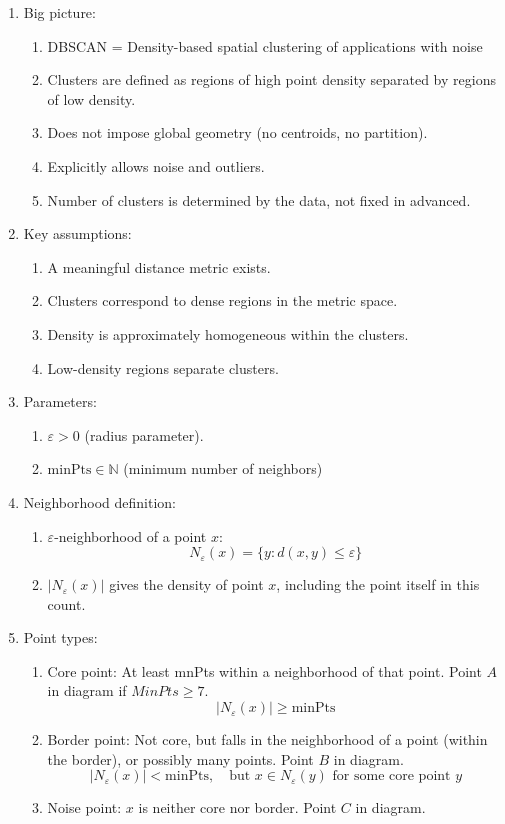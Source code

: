 \documentclass{article}
\begin{document}
\begin{enumerate}
\item Big picture:
\begin{enumerate}
\item DBSCAN = Density-based spatial clustering of applications with noise
\item Clusters are defined as regions of high point density separated by regions of low density.
\item Does not impose global geometry (no centroids, no partition).
\item Explicitly allows noise and outliers.
\item Number of clusters is determined by the data, not fixed in advanced.
\end{enumerate}

\item Key assumptions:
\begin{enumerate}
\item A meaningful distance metric exists.
\item Clusters correspond to dense regions in the metric space.
\item Density is approximately homogeneous within the clusters.
\item Low-density regions separate clusters.
\end{enumerate}

\item Parameters:
\begin{enumerate}
\item $\varepsilon > 0$ (radius parameter).
\item $\text{minPts} \in \mathbb{N}$ (minimum number of neighbors)
\end{enumerate}

\item Neighborhood definition:
\begin{enumerate}
\item $\varepsilon$-neighborhood of a point $x$:
\[
N_{\varepsilon} (x) = \{y : d(x,y) \leq \varepsilon \}
\]
\item $|N_{\varepsilon} (x)|$ gives the density of point $x$, including the point itself in this count.
\end{enumerate}

\item Point types: 
\begin{enumerate}
\item Core point: At least mnPts within a neighborhood of that point. Point $A$ in diagram if $MinPts \geq 7$. 
\[
|N_{\varepsilon} (x) | \geq \text{minPts}
\]
\item Border point: Not core, but falls in the neighborhood of a point (within the border), or possibly many points. Point $B$ in diagram.
\[
|N_{\varepsilon} (x) | < \text{minPts}, \quad \text{but } x \in N_{\varepsilon}(y) \text{ for some core point } y
\]
\item Noise point: $x$ is neither core nor border. Point $C$ in diagram.
\end{enumerate}


\end{enumerate}
\end{document}
